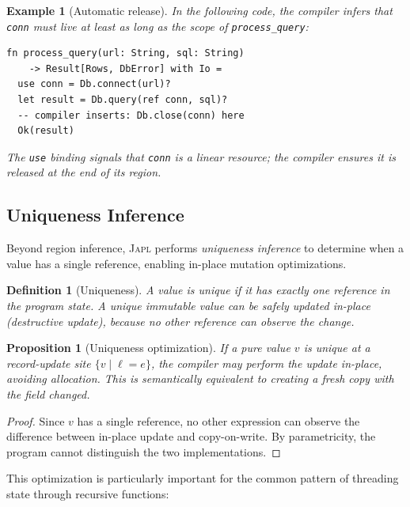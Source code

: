\documentclass[11pt]{article}
\newtheorem{proposition}[theorem]{Proposition}
\newtheorem{definition}[theorem]{Definition}
\newtheorem{example}[theorem]{Example}
\newcommand{\JAPL}{\textsc{Japl}}
\begin{document}
\begin{example}[Automatic release]\label{ex:auto-release}
In the following code, the compiler infers that \texttt{conn} must
live at least as long as the scope of \texttt{process\_query}:
\begin{lstlisting}[caption={Region inference inserts Db.close automatically},label={lst:region}]
fn process_query(url: String, sql: String)
    -> Result[Rows, DbError] with Io =
  use conn = Db.connect(url)?
  let result = Db.query(ref conn, sql)?
  -- compiler inserts: Db.close(conn) here
  Ok(result)
\end{lstlisting}
The \texttt{use} binding signals that \texttt{conn} is a linear
resource; the compiler ensures it is released at the end of its
region.
\end{example}

\subsection{Uniqueness Inference}\label{sec:uniqueness-inference}

Beyond region inference, \JAPL{} performs \emph{uniqueness inference}
to determine when a value has a single reference, enabling in-place
mutation optimizations.

\begin{definition}[Uniqueness]\label{def:uniqueness}
A value is \emph{unique} if it has exactly one reference in the
program state.  A unique immutable value can be safely updated
in-place (destructive update), because no other reference can observe
the change.
\end{definition}

\begin{proposition}[Uniqueness optimization]\label{prop:uniqueness-opt}
If a pure value $v$ is unique at a record-update site
$\{ v \mid \ell = e \}$, the compiler may perform the update in-place,
avoiding allocation.  This is semantically equivalent to
creating a fresh copy with the field changed.
\end{proposition}

\begin{proof}
Since $v$ has a single reference, no other expression can observe the
difference between in-place update and copy-on-write.  By
parametricity, the program cannot distinguish the two implementations.
\end{proof}

This optimization is particularly important for the common pattern
of threading state through recursive functions:
\end{document}

